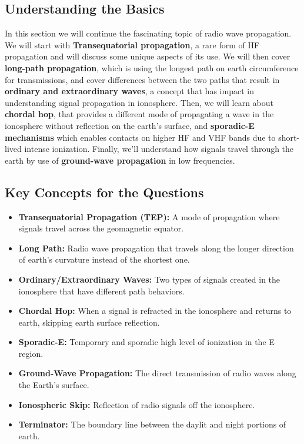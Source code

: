 \subsection*{Understanding the Basics}
In this section we will continue the fascinating topic of radio wave propagation. We will start with \textcolor{myblue}{\textbf{Transequatorial propagation}}, a rare form of HF propagation and will discuss some unique aspects of its use. We will then cover \textcolor{myblue}{\textbf{long-path propagation}}, which is using the longest path on earth circumference for transmissions, and cover differences between the two paths that result in \textcolor{myblue}{\textbf{ordinary and extraordinary waves}}, a concept that has impact in understanding signal propagation in ionosphere. Then, we will learn about \textcolor{myblue}{\textbf{chordal hop}}, that provides a different mode of propagating a wave in the ionosphere without reflection on the earth's surface, and  \textcolor{myblue}{\textbf{sporadic-E mechanisms}} which enables contacts on higher HF and VHF bands due to short-lived intense ionization. Finally, we'll understand how signals travel through the earth by use of \textcolor{myblue}{\textbf{ground-wave propagation}} in low frequencies.

\subsection*{Key Concepts for the Questions}
\begin{itemize}
    \item \textbf{Transequatorial Propagation (TEP):}  A mode of propagation where signals travel across the geomagnetic equator.
     \item \textbf{Long Path:} Radio wave propagation that travels along the longer direction of earth’s curvature instead of the shortest one.
    \item \textbf{Ordinary/Extraordinary Waves:} Two types of signals created in the ionosphere that have different path behaviors.
        \item  \textbf{Chordal Hop:} When a signal is refracted in the ionosphere and returns to earth, skipping earth surface reflection.
    \item \textbf{Sporadic-E:} Temporary and sporadic high level of ionization in the E region.
      \item \textbf{Ground-Wave Propagation:}  The direct transmission of radio waves along the Earth's surface.
      \item \textbf{Ionospheric Skip:} Reflection of radio signals off the ionosphere.
     \item \textbf{Terminator:} The boundary line between the daylit and night portions of earth.
\end{itemize}

